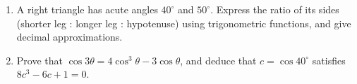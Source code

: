 \begin{enumerate}
\item[(a)] A right triangle has acute angles $40^\circ$ and $50^\circ$. Express the ratio of its sides (shorter leg : longer leg : hypotenuse) using trigonometric functions, and give decimal approximations.
\item[(b)] Prove that $\cos3\theta=4\cos^3\theta-3\cos\theta$, and deduce that $c=\cos40^\circ$ satisfies $8c^3-6c+1=0$.
\end{enumerate}
